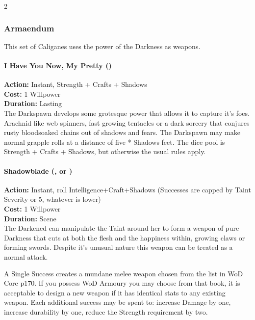 \begin{multicols}{2}
\subsubsection*{Armaendum}

This set of Caliganes uses the power of the Darkness as weapons. \\

\paragraph*{I Have You Now, My Pretty (\textbullet\textbullet)}

\noindent \textbf{Action:} Instant, Strength + Crafts + Shadows\\

\noindent \textbf{Cost:} 1 Willpower\\

\noindent \textbf{Duration:} Lasting \\

\noindent The Darkspawn develops some grotesque power that allows it to capture it's foes. Arachnid like web spinners, fast growing tentacles or a dark sorcery that conjures rusty bloodsoaked chains out of shadows and fears. The Darkspawn may make normal grapple rolls at a distance of five * Shadows feet. The dice pool is Strength + Crafts + Shadows, but otherwise the usual rules apply.\\

\paragraph*{Shadowblade (\textbullet, \textbullet\textbullet\textbullet or \textbullet\textbullet\textbullet\textbullet\textbullet)}

\noindent \textbf{Action:} Instant, roll Intelligence+Craft+Shadows (Successes are capped by Taint Severity or 5, whatever is lower) \\

\noindent \textbf{Cost:} 1 Willpower \\

\noindent \textbf{Duration:} Scene \\

\noindent The Darkened can manipulate the Taint around her to form a weapon of pure Darkness that cuts at both the flesh and the happiness within, growing claws or forming swords. Despite it's unusual nature this weapon can be treated as a normal attack.

A Single Success creates a mundane melee weapon chosen from the list in WoD Core p170. If you possess WoD Armoury you may choose from that book, it is acceptable to design a new weapon if it has identical stats to any existing weapon. Each additional success may be spent to: increase Damage by one, increase durability by one, reduce the Strength requirement by two.


\end{multicols}
